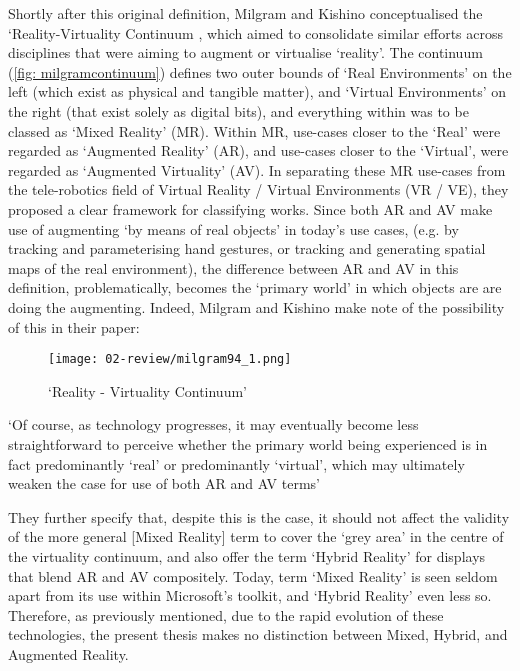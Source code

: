 Shortly after this original definition, Milgram and Kishino conceptualised the `Reality-Virtuality Continuum \citeyearpar{milgram1994}, which aimed to consolidate similar efforts across disciplines that were aiming to augment or virtualise `reality'. The continuum (\autoref{fig: milgramcontinuum}) defines two outer bounds of `Real Environments' on the left (which exist as physical and tangible matter), and `Virtual Environments' on the right (that exist solely as digital bits), and everything within was to be classed as `Mixed Reality' (MR). Within MR, use-cases closer to the `Real' were regarded as `Augmented Reality' (AR), and use-cases closer to the `Virtual', were regarded as `Augmented Virtuality' (AV). In separating these MR use-cases from the tele-robotics field of Virtual Reality / Virtual Environments (VR / VE), they proposed a clear framework for classifying works. Since both AR and AV make use of augmenting `by means of real objects' in today's use cases, (e.g. by tracking and parameterising hand gestures, or tracking and generating spatial maps of the real environment), the difference between AR and AV in this definition, problematically, becomes the `primary world' in which objects are are doing the augmenting. Indeed, Milgram and Kishino make note of the possibility of this in their paper: 

\begin{figure}[bth]
    \myfloatalign
    {\texttt{[image: 02-review/milgram94\_1.png]}}
    \caption[`Reality - Virtuality Continuum']{`Reality - Virtuality Continuum'}\label{fig: milgramcontinuum}
\end{figure}

`Of course, as technology progresses, it may eventually become less straightforward to perceive whether the primary world being experienced is in fact predominantly `real' or predominantly `virtual', which may ultimately weaken the case for use of both AR and AV terms'

They further specify that, despite this is the case, it should not affect the validity of the more general [Mixed Reality] term to cover the `grey area' in the centre of the virtuality continuum, and also offer the term `Hybrid Reality' for displays that blend AR and AV compositely. Today, term `Mixed Reality' is seen seldom apart from its use within Microsoft's toolkit, and `Hybrid Reality' even less so. Therefore, as previously mentioned, due to the rapid evolution of these technologies, the present thesis makes no distinction between Mixed, Hybrid, and Augmented Reality.

